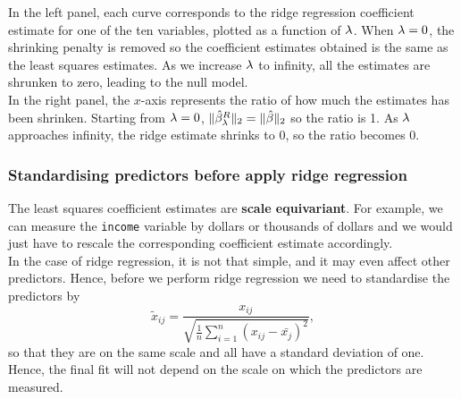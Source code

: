 \documentclass{report}
\newcommand{\gbh}{\hat{\gb}}
\begin{document}
	In the left panel, each curve corresponds to the ridge regression coefficient estimate for one of the ten variables, plotted as a function of $\lambda$. When $\lambda=0$, the shrinking penalty is removed so the coefficient estimates obtained is the same as the least squares estimates. As we increase $\lambda$ to infinity, all the estimates are shrunken to zero, leading to the null model.\\
	
	In the right panel, the $x$-axis represents the ratio of how much the estimates has been shrinken. Starting from $\lambda=0$, $\|\gbh_{\lm}^R\|_2=\|\gbh\|_2$ so the ratio is 1. As $\lambda$ approaches infinity, the ridge estimate shrinks to 0, so the ratio becomes 0. 
	
	\pagebreak
	
	\subsubsection{Standardising predictors before apply ridge regression}
	
	The least squares coefficient estimates are \textbf{scale equivariant}. For example, we can measure the \texttt{income} variable by dollars or thousands of dollars and we would just have to rescale the corresponding coefficient estimate accordingly.\\
	
	In the case of ridge regression, it is not that simple, and it may even affect other predictors. Hence, before we perform ridge regression we need to standardise the predictors by 
	$$\tilde{x}_{ij}=\frac{x_{ij}}{\sqrt{\frac{1}{n}\sum_{i=1}^{n}(x_{ij}-\bar{x_j})^2}},$$
	so that they are on the same scale and all have a standard deviation of one. Hence, the final fit will not depend on the scale on which the predictors are measured. 
	
\end{document}
